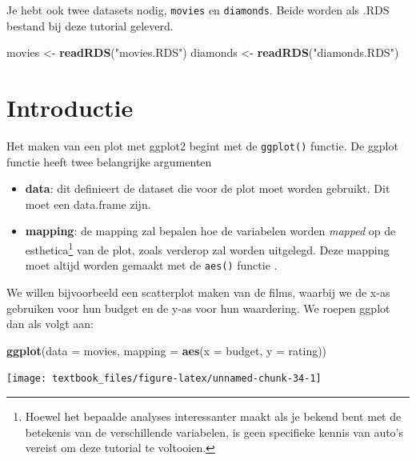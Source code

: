 \documentclass[]{tufte-book}
\newenvironment{Shaded}{}{}
\newcommand{\DataTypeTok}[1]{\textcolor[rgb]{0.56,0.13,0.00}{#1}}
\newcommand{\KeywordTok}[1]{\textcolor[rgb]{0.00,0.44,0.13}{\textbf{#1}}}
\newcommand{\NormalTok}[1]{#1}
\newcommand{\StringTok}[1]{\textcolor[rgb]{0.25,0.44,0.63}{#1}}
\providecommand{\tightlist}{%
  \setlength{\itemsep}{0pt}\setlength{\parskip}{0pt}}
\begin{document}
Je hebt ook twee datasets nodig, \texttt{movies} en \texttt{diamonds}. Beide worden als .RDS bestand bij deze tutorial geleverd.

\begin{Shaded}
\begin{Highlighting}[]
\NormalTok{movies <-}\StringTok{ }\KeywordTok{readRDS}\NormalTok{(}\StringTok{"movies.RDS"}\NormalTok{)}
\NormalTok{diamonds <-}\StringTok{ }\KeywordTok{readRDS}\NormalTok{(}\StringTok{"diamonds.RDS"}\NormalTok{)}
\end{Highlighting}
\end{Shaded}

\hypertarget{introductie}{%
\section{Introductie}\label{introductie}}

Het maken van een plot met ggplot2 begint met de \texttt{ggplot()} functie. De ggplot functie heeft twee belangrijke argumenten

\begin{itemize}
\tightlist
\item
  \textbf{data}: dit definieert de dataset die voor de plot moet worden gebruikt. Dit moet een data.frame zijn.
\item
  \textbf{mapping}: de mapping zal bepalen hoe de variabelen worden \emph{mapped} op de esthetica\footnote{Hoewel het bepaalde analyses interessanter maakt als je bekend bent met de betekenis van de verschillende variabelen, is geen specifieke kennis van auto's vereist om deze tutorial te voltooien.} van de plot, zoals verderop zal worden uitgelegd. Deze mapping moet altijd worden gemaakt met de \texttt{aes()} functie .
\end{itemize}

We willen bijvoorbeeld een scatterplot maken van de films, waarbij we de x-as gebruiken voor hun budget en de y-as voor hun waardering. We roepen ggplot dan als volgt aan:

\begin{Shaded}
\begin{Highlighting}[]
\KeywordTok{ggplot}\NormalTok{(}\DataTypeTok{data =}\NormalTok{ movies, }\DataTypeTok{mapping =} \KeywordTok{aes}\NormalTok{(}\DataTypeTok{x =}\NormalTok{ budget, }\DataTypeTok{y =}\NormalTok{ rating))}
\end{Highlighting}
\end{Shaded}

\texttt{[image: textbook\_files/figure-latex/unnamed-chunk-34-1]}
\end{document}
